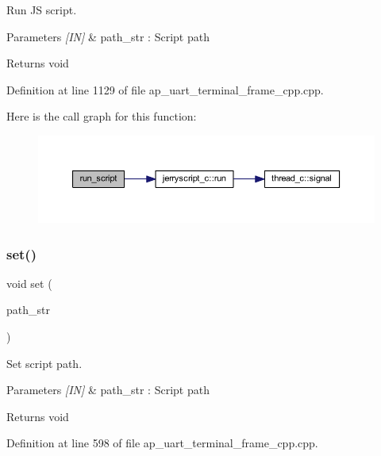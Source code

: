 Run JS script. 


\begin{DoxyParams}{Parameters}
{\em \mbox{[}\+I\+N\mbox{]}} & path\+\_\+str \+: Script path \\
\hline
\end{DoxyParams}
\begin{DoxyReturn}{Returns}
void 
\end{DoxyReturn}


Definition at line 1129 of file ap\+\_\+uart\+\_\+terminal\+\_\+frame\+\_\+cpp.\+cpp.

Here is the call graph for this function\+:
\nopagebreak
\begin{figure}[H]
\begin{center}
\leavevmode
\includegraphics[width=350pt]{group___u_a_r_t__terminal_ga5ad6770a94d4fba50b27ae366ba4580d_cgraph}
\end{center}
\end{figure}
\mbox{\label{group___u_a_r_t__terminal_gafb195c4fd235aaa4c2da3815ec46eeba}} 
\subsubsection{set()}
{\footnotesize\ttfamily void set (\begin{DoxyParamCaption}\item[{wx\+String}]{path\+\_\+str }\end{DoxyParamCaption})}



Set script path. 


\begin{DoxyParams}{Parameters}
{\em \mbox{[}\+I\+N\mbox{]}} & path\+\_\+str \+: Script path \\
\hline
\end{DoxyParams}
\begin{DoxyReturn}{Returns}
void 
\end{DoxyReturn}


Definition at line 598 of file ap\+\_\+uart\+\_\+terminal\+\_\+frame\+\_\+cpp.\+cpp.

